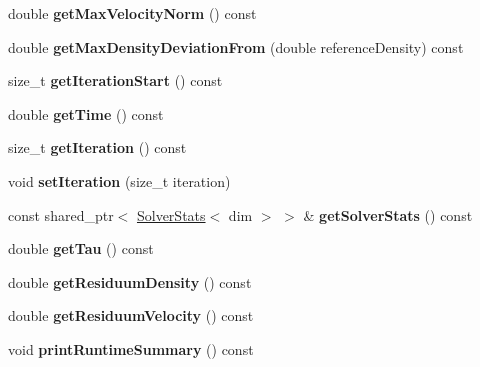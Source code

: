 \begin{DoxyCompactItemize}
\item 
\hypertarget{classnatrium_1_1CFDSolver_ae9c44bb0f33e2c73ee96fbe100061842}{
double {\bfseries getMaxVelocityNorm} () const }
\label{classnatrium_1_1CFDSolver_ae9c44bb0f33e2c73ee96fbe100061842}

\item 
\hypertarget{classnatrium_1_1CFDSolver_ade641431988a82cb47d88a9d600e1c92}{
double {\bfseries getMaxDensityDeviationFrom} (double referenceDensity) const }
\label{classnatrium_1_1CFDSolver_ade641431988a82cb47d88a9d600e1c92}

\item 
\hypertarget{classnatrium_1_1CFDSolver_a33c4bfd63b8d457a5bc15f0c0da02c38}{
size\_\-t {\bfseries getIterationStart} () const }
\label{classnatrium_1_1CFDSolver_a33c4bfd63b8d457a5bc15f0c0da02c38}

\item 
\hypertarget{classnatrium_1_1CFDSolver_a8e3686b16794c0040bd5cc7cf9fe98d3}{
double {\bfseries getTime} () const }
\label{classnatrium_1_1CFDSolver_a8e3686b16794c0040bd5cc7cf9fe98d3}

\item 
\hypertarget{classnatrium_1_1CFDSolver_a3c0920e02df800abcfb8f82518cab0ca}{
size\_\-t {\bfseries getIteration} () const }
\label{classnatrium_1_1CFDSolver_a3c0920e02df800abcfb8f82518cab0ca}

\item 
\hypertarget{classnatrium_1_1CFDSolver_a97546801de9259206f9611c14ce9ff1d}{
void {\bfseries setIteration} (size\_\-t iteration)}
\label{classnatrium_1_1CFDSolver_a97546801de9259206f9611c14ce9ff1d}

\item 
\hypertarget{classnatrium_1_1CFDSolver_ab40725ea85fde34033d92027d13a4b06}{
const shared\_\-ptr$<$ \hyperlink{classnatrium_1_1SolverStats}{SolverStats}$<$ dim $>$ $>$ \& {\bfseries getSolverStats} () const }
\label{classnatrium_1_1CFDSolver_ab40725ea85fde34033d92027d13a4b06}

\item 
\hypertarget{classnatrium_1_1CFDSolver_abcce31d3ba9b00e148780b6c855d189b}{
double {\bfseries getTau} () const }
\label{classnatrium_1_1CFDSolver_abcce31d3ba9b00e148780b6c855d189b}

\item 
\hypertarget{classnatrium_1_1CFDSolver_a1a508263caff799245a183989efd6680}{
double {\bfseries getResiduumDensity} () const }
\label{classnatrium_1_1CFDSolver_a1a508263caff799245a183989efd6680}

\item 
\hypertarget{classnatrium_1_1CFDSolver_a051ad2daa843e9edf9f1243b3c062686}{
double {\bfseries getResiduumVelocity} () const }
\label{classnatrium_1_1CFDSolver_a051ad2daa843e9edf9f1243b3c062686}

\item 
\hypertarget{classnatrium_1_1CFDSolver_adcec28e954e67146878eaffa5bd1e005}{
void {\bfseries printRuntimeSummary} () const }
\label{classnatrium_1_1CFDSolver_adcec28e954e67146878eaffa5bd1e005}

\end{DoxyCompactItemize}
